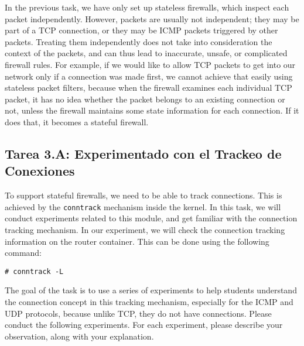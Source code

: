 In the previous task, we have only set up stateless firewalls, which inspect each
packet independently. However, packets
are usually not independent; they may be part of a TCP connection,
or they may be ICMP packets triggered by other packets. Treating them
independently does not take into consideration the context of the
packets, and can thus lead to inaccurate, unsafe, or complicated firewall rules.
For example, if we would like to allow TCP packets to get into our network
only if a connection was made first, we cannot achieve that easily 
using stateless packet filters, because when the firewall examines each individual TCP packet,
it has no idea whether the packet belongs to an existing connection
or not, unless the firewall maintains some state information for each connection.
If it does that, it becomes a stateful firewall.


\subsection{Tarea 3.A: Experimentado con el Trackeo de Conexiones} 


To support stateful firewalls, we need to be able to track connections. 
This is achieved by the \texttt{conntrack} mechanism inside the kernel. 
In this task, we will conduct experiments related to this module, and 
get familiar with the connection tracking mechanism. 
In our experiment, we will check the connection tracking information
on the router container. This can be done using the following command: 

\begin{lstlisting}
# conntrack -L
\end{lstlisting}

The goal of the task is to use a series of experiments to 
help students understand the 
connection concept in this tracking mechanism, especially
for the ICMP and UDP protocols, because unlike TCP,  they 
do not have connections. 
Please conduct the following experiments. For each experiment, please 
describe your observation, along with your explanation. 

